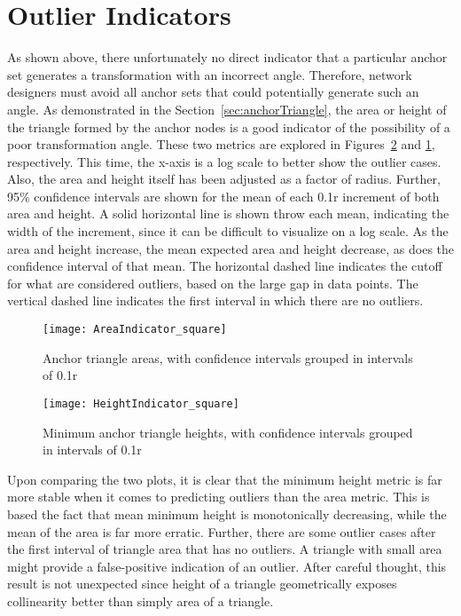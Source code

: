 \section{Outlier Indicators} 
\label{sec:outlierindicators}
As shown above, there unfortunately no direct indicator that a particular anchor set generates a transformation with an incorrect angle.  Therefore, network designers must avoid all anchor sets that could potentially generate such an angle.  As demonstrated in the Section~\ref{sec:anchorTriangle}, the area or height of the triangle formed by the anchor nodes is a good indicator of the possibility of a poor transformation angle.  These two metrics are explored in Figures~\ref{fig:heightIndicator} and \ref{fig:areaIndicator}, respectively.  This time, the x-axis is a log scale to better show the outlier cases. Also, the area and height itself has been adjusted as a factor of radius. Further, 95\% confidence intervals are shown for the mean of each 0.1r increment of both area and height.  A solid horizontal line is shown throw each mean, indicating the width of the increment, since it can be difficult to visualize on a log scale.  As the area and height increase, the mean expected area and height decrease, as does the confidence interval of that mean.  The horizontal dashed line indicates the cutoff for what are considered outliers, based on the large gap in data points.  The vertical dashed line indicates the first interval in which there are no outliers.  

\begin{figure}
  \centering
	\texttt{[image: AreaIndicator\_square]}
	\caption[Anchor triangle areas]{Anchor triangle areas, with confidence intervals grouped in intervals of 0.1r}	
	\label{fig:areaIndicator}
\end{figure}

\begin{figure}
  \centering
	\texttt{[image: HeightIndicator\_square]}
	\caption[Minimum anchor triangle heights]{Minimum anchor triangle heights, with confidence intervals grouped in intervals of 0.1r}	
	\label{fig:heightIndicator}
\end{figure}

Upon comparing the two plots, it is clear that the minimum height metric is far more stable when it comes to predicting outliers than the area metric.  This is based the fact that mean minimum height is monotonically decreasing, while the mean of the area is far more erratic.  Further, there are some outlier cases after the first interval of triangle area that has no outliers.  A triangle with small area might provide a false-positive indication of an outlier.  After careful thought, this result is not unexpected since height of a triangle geometrically exposes collinearity better than simply area of a triangle.

